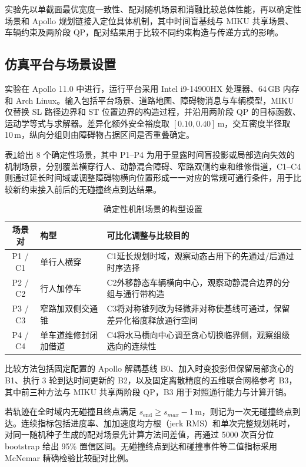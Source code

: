 \documentclass[a4paper,zihao=5]{ctexart}
\theoremstyle{definition}
\begin{document}
实验先以单截面最优宽度一致性、配对随机场景和消融比较总体性能，再以确定性场景和 Apollo 规划链接入定位具体机制，其中时间盲基线与 MIKU 共享场景、车辆约束及两阶段 QP，配对结果用于比较不同约束构造与传递方式的影响。

\subsection{仿真平台与场景设置}
\label{subsec:exp_setup}

实验在 Apollo 11.0 中进行，运行平台采用 Intel i9-14900HX 处理器、64\,GB 内存和 Arch Linux。输入包括平台场景、道路地图、障碍物消息与车辆模型，MIKU 仅替换 SL 路径边界和 ST 位置边界的构造过程，并沿用两阶段 QP 的目标函数、运动学等式与求解器。差异化额外安全裕度取 $[0.10,0.40]$\,m，交互密度半径取 10\,m，纵向分组则由障碍物占据区间是否重叠确定。

表\ref{tab:exp_scenarios}给出 8 个确定性场景，其中 P1--P4 为用于显露时间盲投影或局部选向失效的机制场景，分别覆盖横穿行人、动静混合障碍、窄路双侧约束和维修借道，C1--C4 则通过延长时间域或调整障碍物横向位置形成一一对应的常规可通行条件，用于比较新约束接入前后的无碰撞终点到达结果。

\begin{table}[htbp]
\centering
\caption{确定性机制场景的构型设置}
\label{tab:exp_scenarios}
\small
\begin{tabular}{c l p{7.4cm}}
\toprule
\textbf{场景对} & \textbf{构型} & \textbf{可比化调整与比较目的} \\
\midrule
P1 / C1 & 单行人横穿 & C1延长规划时域，观察动态占用下的先通过/后通过时序选择 \\
P2 / C2 & 行人加停车 & C2外移静态车辆横向中心，观察动静混合边界的分组与通行带构造 \\
P3 / C3 & 窄路加双侧交通锥 & C3将对称锥列改为轻微非对称使基线可通过，保留差异化裕度释放通行空间 \\
P4 / C4 & 单车道维修封闭加借道 & C4将水马横向中心调至贪心切换临界侧，观察组级选向的连续性 \\
\bottomrule
\end{tabular}
\end{table}

比较方法包括固定配置的 Apollo 解耦基线 B0、加入时变投影但保留局部贪心的 B1、执行 3 轮到达时间更新的 B2，以及固定离散精度的五维联合网格参考 B3，其中前三种方法与 MIKU 共享两阶段 QP，B3 用于对照通行能力与计算开销。

若轨迹在全时域内无碰撞且终点满足 $s_{\mathrm{end}}\geq s_{max}-1$\,m，则记为一次无碰撞终点到达。连续指标包括进度率、加加速度均方根（jerk RMS）和单次完整规划耗时，对同一随机种子生成的配对场景先计算方法间差值，再通过 5000 次百分位 bootstrap 给出 95\% 置信区间。无碰撞终点到达和碰撞事件等二值指标采用 McNemar 精确检验比较配对比例。
\end{document}
